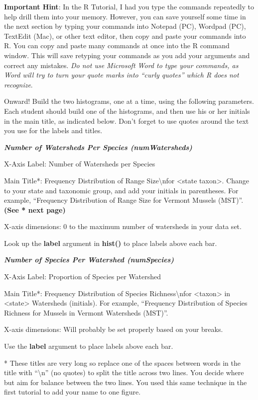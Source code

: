 \textbf{Important Hint}: In the R Tutorial, I had you type the commands
repeatedly to help drill them into your memory. However, you can save
yourself some time in the next section by typing your commands into
Notepad (PC), Wordpad (PC), TextEdit (Mac), or other text editor, then
copy and paste your commands into R. You can copy and paste many
commands at once into the R command window. This will save retyping your
commands as you add your arguments and correct any mistakes. \emph{Do
not use Microsoft Word to type your commands, as Word will try to turn
your quote marks into ``curly quotes'' which R does not recognize}.

Onward! Build the two histograms, one at a time, using the following
parameters. Each student should build one of the histograms, and then
use his or her initials in the main title, as indicated below. Don't
forget to use quotes around the text you use for the labels and titles.

\textbf{\emph{Number of Watersheds Per Species (numWatersheds)}}

X-Axis Label: Number of Watersheds per Species

Main Title*: Frequency Distribution of Range Size\textbackslash{}nfor
\textless{}state taxon\textgreater{}. Change to your state and taxonomic
group, and add your initials in parentheses. For example, ``Frequency
Distribution of Range Size for Vermont Mussels (MST)''. \textbf{(See *
next page)}

X-axis dimensions: 0 to the maximum number of watersheds in your data
set.

Look up the \textbf{label} argument in \textbf{hist()} to place labels
above each bar.

\textbf{\emph{Number of Species Per Watershed (numSpecies)}}

X-Axis Label: Proportion of Species per Watershed

Main Title*: Frequency Distribution of Species
Richness\textbackslash{}nfor \textless{}taxon\textgreater{} in
\textless{}state\textgreater{} Watersheds (initials). For example,
``Frequency Distribution of Species Richness for Mussels in Vermont
Watersheds (MST)''.

X-axis dimensions: Will probably be set properly based on your breaks.

Use the \textbf{label} argument to place labels above each bar.

* These titles are very long so replace one of the spaces between words
in the title with ``\textbackslash{}n'' (no quotes) to split the title
across two lines. You decide where but aim for balance between the two
lines. You used this same technique in the first tutorial to add your
name to one figure.

